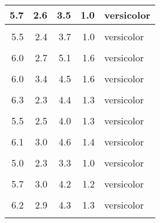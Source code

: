 \documentclass[
]{article}
\begin{document}
\begin{table}
\begin{tabular}[t]{r|r|r|r|l}
\hline
5.7 & 2.6 & 3.5 & 1.0 & versicolor\\
\hline
\cellcolor{gray!6}{5.5} & \cellcolor{gray!6}{2.4} & \cellcolor{gray!6}{3.8} & \cellcolor{gray!6}{1.1} & \cellcolor{gray!6}{versicolor}\\
\hline
5.5 & 2.4 & 3.7 & 1.0 & versicolor\\
\hline
\cellcolor{gray!6}{5.8} & \cellcolor{gray!6}{2.7} & \cellcolor{gray!6}{3.9} & \cellcolor{gray!6}{1.2} & \cellcolor{gray!6}{versicolor}\\
\hline
6.0 & 2.7 & 5.1 & 1.6 & versicolor\\
\hline
\cellcolor{gray!6}{5.4} & \cellcolor{gray!6}{3.0} & \cellcolor{gray!6}{4.5} & \cellcolor{gray!6}{1.5} & \cellcolor{gray!6}{versicolor}\\
\hline
6.0 & 3.4 & 4.5 & 1.6 & versicolor\\
\hline
\cellcolor{gray!6}{6.7} & \cellcolor{gray!6}{3.1} & \cellcolor{gray!6}{4.7} & \cellcolor{gray!6}{1.5} & \cellcolor{gray!6}{versicolor}\\
\hline
6.3 & 2.3 & 4.4 & 1.3 & versicolor\\
\hline
\cellcolor{gray!6}{5.6} & \cellcolor{gray!6}{3.0} & \cellcolor{gray!6}{4.1} & \cellcolor{gray!6}{1.3} & \cellcolor{gray!6}{versicolor}\\
\hline
5.5 & 2.5 & 4.0 & 1.3 & versicolor\\
\hline
\cellcolor{gray!6}{5.5} & \cellcolor{gray!6}{2.6} & \cellcolor{gray!6}{4.4} & \cellcolor{gray!6}{1.2} & \cellcolor{gray!6}{versicolor}\\
\hline
6.1 & 3.0 & 4.6 & 1.4 & versicolor\\
\hline
\cellcolor{gray!6}{5.8} & \cellcolor{gray!6}{2.6} & \cellcolor{gray!6}{4.0} & \cellcolor{gray!6}{1.2} & \cellcolor{gray!6}{versicolor}\\
\hline
5.0 & 2.3 & 3.3 & 1.0 & versicolor\\
\hline
\cellcolor{gray!6}{5.6} & \cellcolor{gray!6}{2.7} & \cellcolor{gray!6}{4.2} & \cellcolor{gray!6}{1.3} & \cellcolor{gray!6}{versicolor}\\
\hline
5.7 & 3.0 & 4.2 & 1.2 & versicolor\\
\hline
\cellcolor{gray!6}{5.7} & \cellcolor{gray!6}{2.9} & \cellcolor{gray!6}{4.2} & \cellcolor{gray!6}{1.3} & \cellcolor{gray!6}{versicolor}\\
\hline
6.2 & 2.9 & 4.3 & 1.3 & versicolor\\
\hline
\cellcolor{gray!6}{5.1} & \cellcolor{gray!6}{2.5} & \cellcolor{gray!6}{3.0} & \cellcolor{gray!6}{1.1} & \cellcolor{gray!6}{versicolor}\\

\end{tabular}
\end{table}
\end{document}

